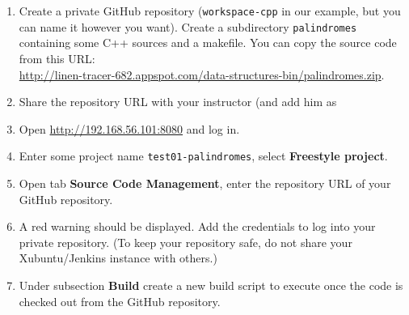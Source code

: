 \documentclass[11pt,a4paper]{article}
\begin{document}
\begin{enumerate}
\item Create a private GitHub repository ({\tt workspace-cpp} in our example, but you can 
name it however you want). Create a subdirectory {\tt palindromes} containing 
some C++ sources and a makefile. You can copy the source code from this URL:\\
\url{http://linen-tracer-682.appspot.com/data-structures-bin/palindromes.zip}.
\item Share the repository URL with your instructor (and add him as 
\item Open \url{http://192.168.56.101:8080} and log in.
\item Enter some project name {\tt test01-palindromes}, select {\bf Freestyle project}.
\item Open tab {\bf Source Code Management}, enter the repository URL of your GitHub repository.\\
\item A red warning should be displayed. Add the credentials to log into your private repository. 
(To keep your repository safe, do not share your Xubuntu/Jenkins instance with others.)\\
\item Under subsection {\bf Build} create a new build script to execute once the code is
checked out from the GitHub repository.\\

\end{enumerate}
\end{document}
